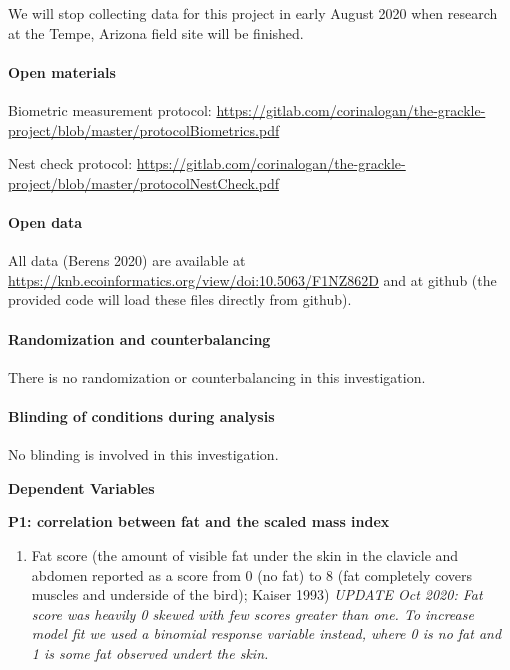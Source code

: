 \documentclass[
]{article}
\providecommand{\tightlist}{%
  \setlength{\itemsep}{0pt}\setlength{\parskip}{0pt}}
\begin{document}
We will stop collecting data for this project in early August 2020 when
research at the Tempe, Arizona field site will be finished.

\hypertarget{open-materials}{%
\paragraph{\texorpdfstring{\textbf{Open
materials}}{Open materials}}\label{open-materials}}

Biometric measurement protocol:
\url{https://gitlab.com/corinalogan/the-grackle-project/blob/master/protocolBiometrics.pdf}

Nest check protocol:
\url{https://gitlab.com/corinalogan/the-grackle-project/blob/master/protocolNestCheck.pdf}

\hypertarget{open-data}{%
\paragraph{\texorpdfstring{\textbf{Open
data}}{Open data}}\label{open-data}}

All data (Berens 2020) are available at
\url{https://knb.ecoinformatics.org/view/doi:10.5063/F1NZ862D} and at
github (the provided code will load these files directly from github).

\hypertarget{randomization-and-counterbalancing}{%
\paragraph{\texorpdfstring{\textbf{Randomization and
counterbalancing}}{Randomization and counterbalancing}}\label{randomization-and-counterbalancing}}

There is no randomization or counterbalancing in this investigation.

\hypertarget{blinding-of-conditions-during-analysis}{%
\paragraph{\texorpdfstring{\textbf{Blinding of conditions during
analysis}}{Blinding of conditions during analysis}}\label{blinding-of-conditions-during-analysis}}

No blinding is involved in this investigation.

\textbf{Dependent Variables}

\textbf{P1: correlation between fat and the scaled mass index}

\begin{enumerate}
\def\labelenumi{\arabic{enumi})}
\tightlist
\item
  Fat score (the amount of visible fat under the skin in the clavicle
  and abdomen reported as a score from 0 (no fat) to 8 (fat completely
  covers muscles and underside of the bird); Kaiser 1993) \emph{UPDATE
  Oct 2020: Fat score was heavily 0 skewed with few scores greater than
  one. To increase model fit we used a binomial response variable
  instead, where 0 is no fat and 1 is some fat observed undert the
  skin.}
\end{enumerate}
\end{document}
